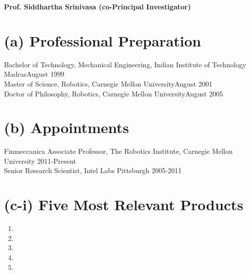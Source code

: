 \documentclass[10pt]{article}
\newcommand{\svn}[1]{\svnsub#1}
\def\svnsub$#1${#1}
\begin{document}
\pagestyle{empty} %

\par{\centering
		{\bf\LARGE Prof. Siddhartha Srinivasa (co-Principal Investigator)
	}\bigskip\par}





\section{(a) Professional Preparation}
\noindent
Bachelor of Technology, Mechanical Engineering, Indian Institute of Technology Madras\hfill August 1999\\
Master of Science, Robotics, Carnegie Mellon University\hfill August 2001\\
Doctor of Philosophy, Robotics, Carnegie Mellon University\hfill August 2005\\

\section{(b) Appointments}
\noindent
Finmeccanica Associate Professor, The Robotics Institute, Carnegie Mellon University \hfill 2011-Present\\
Senior Research Scientist, Intel Labs Pittsburgh \hfill 2005-2011\\

\section{(c-i) Five Most Relevant Products}
\renewcommand{\labelenumi}{[ \arabic{enumi} ]\hfill}
\begin{enumerate}

\item {}

\item {}

\item {}

\item {}

\item {}


\end{enumerate}
\end{document}
